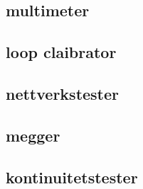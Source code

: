 \subsection{multimeter}
\subsection{loop claibrator}
\subsection{nettverkstester}
\subsection{megger}
\subsection{kontinuitetstester}





